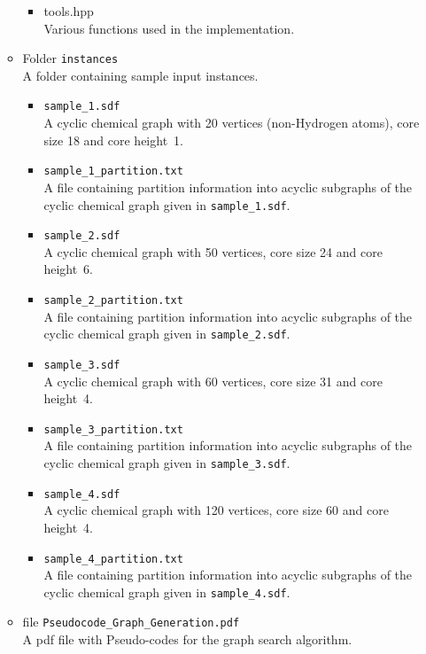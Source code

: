 \documentclass[11pt,titlepage,dvipdfmx,twoside]{article}
\begin{document}
\begin{itemize}
\begin{itemize}
\begin{itemize}
			\item{tools.hpp}\\
				Various functions used in the implementation.
		\end{itemize}
	\item Folder {\tt instances}\\
		A folder containing sample input instances.
		\begin{itemize}
			\item{\tt sample\_1.sdf}\\
			  A cyclic chemical graph with 20 vertices (non-Hydrogen atoms),
			    core size 18 and core height~1.
			\item{\tt sample\_1\_partition.txt}\\
			  A file containing partition information into acyclic subgraphs 
				of the cyclic chemical graph given in {\tt sample\_1.sdf}.
			\item{\tt sample\_2.sdf}\\
			  A cyclic chemical graph with 50 vertices, 
			    core size 24 and core height~6.
			\item{\tt sample\_2\_partition.txt}\\
			  A file containing partition information into acyclic subgraphs 
				of the cyclic chemical graph given in {\tt sample\_2.sdf}.
			\item{\tt sample\_3.sdf}\\
			  A cyclic chemical graph with 60 vertices, 
			    core size 31 and core height~4.
			\item{\tt sample\_3\_partition.txt}\\
			  A file containing partition information into acyclic subgraphs 
				of the cyclic chemical graph given in {\tt sample\_3.sdf}.
			\item{\tt sample\_4.sdf}\\
			  A cyclic chemical graph with 120 vertices, 
			    core size 60 and core height~4.
			\item{\tt sample\_4\_partition.txt}\\
			  A file containing partition information into acyclic subgraphs 
				of the cyclic chemical graph given in {\tt sample\_4.sdf}.
		\end{itemize}
			
			\item{file {\tt Pseudocode\_Graph\_Generation.pdf}}\\
			  A pdf file with Pseudo-codes for the graph search algorithm.
		\end{itemize}

	\end{itemize}
\end{document}
